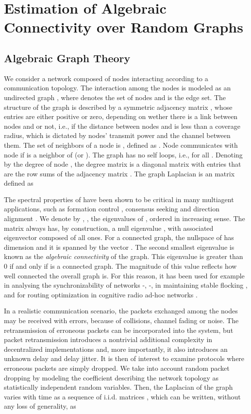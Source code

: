 \documentclass[10pt,twocolumn]{IEEEtran}
\begin{document}
\section{Estimation of Algebraic Connectivity over Random Graphs}

\subsection{Algebraic Graph Theory}

We consider a network composed of  nodes interacting according to a communication topology. The interaction among the nodes is modeled as an undirected graph , where   denotes the set of nodes and  is the edge set. The structure of the graph is described by a symmetric  adjacency matrix , whose entries  are either positive or zero, depending on wether there is a link between nodes  and  or not, i.e., if the distance between nodes  and  is less than a coverage radius, which is dictated by nodes' transmit power and the channel between them. The set of neighbors of a node  is , defined as . Node  communicates with node  if  is a neighbor of  (or ). The graph has no self loops, i.e.,  for all . Denoting by  the degree of node ,  the degree matrix  is a diagonal matrix with entries  that are the row sums of the adjacency matrix . The graph Laplacian  is an  matrix defined as

The spectral properties of  have been shown to be critical in many multiagent applications, such as formation control \cite{Fax_murray}, consensus seeking \cite{Barb-Scut} and direction alignment \cite{Jad-Lin-Morse}. We denote by , , the eigenvalues of , ordered in increasing sense. The matrix  always has, by construction, a null eigenvalue , with associated eigenvector  composed of all ones. For a connected graph, the nullspace of  has dimension  and it is spanned by the vector . The second smallest eigenvalue  is known as the {\it algebraic connectivity} of the graph. This eigenvalue is greater than 0 if and only if  is a connected graph. The magnitude of this value reflects how well connected the overall graph is. For this reason, it has been used for example in analysing the synchronizability of networks \cite{Olfati1}-\cite{Scutari-Barbarossa-Pescosolido}, \cite{Fax_murray}-\cite{Barb-Scut}, in maintaining stable flocking   \cite{Jad-Lin-Morse}, and for routing optimization in cognitive radio ad-hoc networks \cite{Abb-Cuo}.

 In a realistic communication scenario, the packets exchanged among the nodes may be received with errors, because of collisions, channel fading or noise. The retransmission of erroneous packets can be incorporated into the system, but packet retransmission introduces a nontrivial additional complexity in decentralized implementations and, more importantly, it also introduces an unknown delay and delay jitter. It is then of interest to examine protocols where erroneous packets are simply dropped. We take into account random packet dropping by modeling the coefficient  describing the network topology as statistically independent random variables. Then, the Laplacian of the graph varies with time as a sequence of i.i.d. matrices , which can be written, without any loss of generality, as
\end{document}
